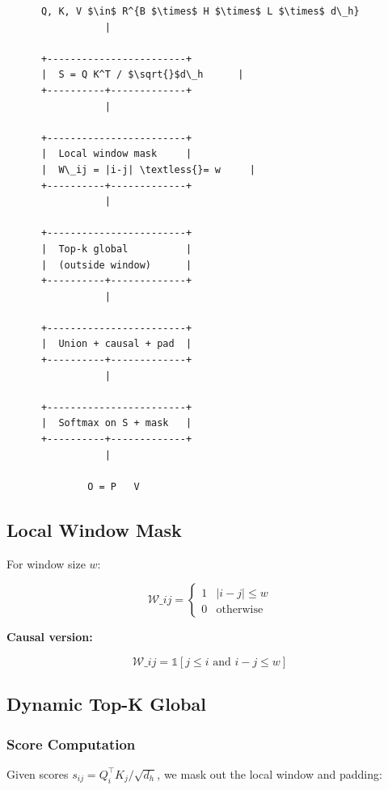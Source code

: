 \begin{lstlisting}
      Q, K, V $\in$ R^{B $\times$ H $\times$ L $\times$ d\_h}
                 |
                  
      +------------------------+
      |  S = Q K^T / $\sqrt{}$d\_h      |
      +----------+-------------+
                 |
                  
      +------------------------+
      |  Local window mask     |
      |  W\_ij = |i-j| \textless{}= w     |
      +----------+-------------+
                 |
                  
      +------------------------+
      |  Top-k global          |
      |  (outside window)      |
      +----------+-------------+
                 |
                  
      +------------------------+
      |  Union + causal + pad  |
      +----------+-------------+
                 |
                  
      +------------------------+
      |  Softmax on S + mask   |
      +----------+-------------+
                 |
                  
              O = P   V
\end{lstlisting}

\subsection{Local Window Mask}

For window size $w$:

\[
\mathcal{W}\_{ij} = \begin{cases} 1 & |i - j| \leq w \\ 0 & \text{otherwise} \end{cases}
\tag{4.1}
\]

\textbf{Causal version:}

\[
\mathcal{W}\_{ij} = \mathbb{1}[j \leq i \text{ and } i - j \leq w]
\tag{4.2}
\]

\subsection{Dynamic Top-K Global}

\subsubsection{Score Computation}

Given scores $s_{ij} = Q_i^\top K_j / \sqrt{d_h}$, we mask out the local 
window and padding:

